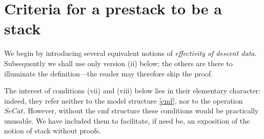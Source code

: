 %

\clearpage
\section{Criteria for a prestack to be a stack}
\label{caracterisationpage}

We begin by introducing several equivalent notions of {\em effectivity of
descent data}. Subsequently we shall use only version (ii) below; the others
are there to illuminate the definition---the reader may therefore skip the
proof.

The interest of conditions (vii) and (viii) below lies in their elementary
character: indeed, they refer neither to the model structure \ref{cmf}, nor to
the operation $SeCat$. However, without the cmf structure these conditions
would be practically unusable. We have included them to facilitate, if need
be, an exposition of the notion of stack without proofs.

